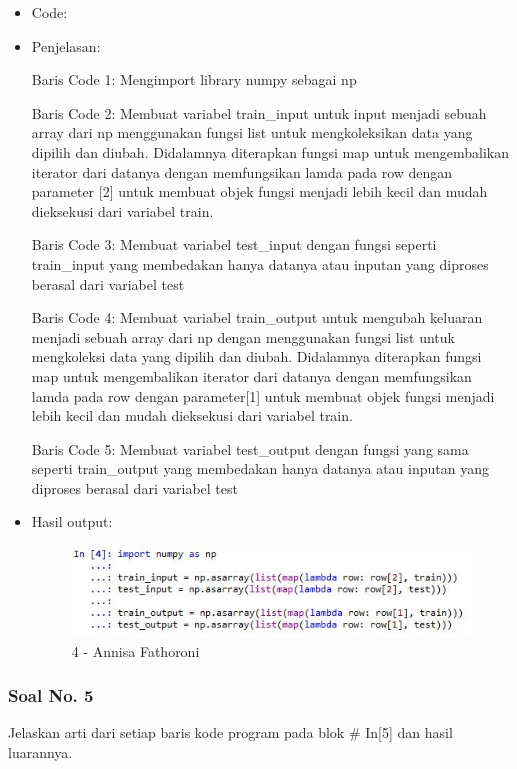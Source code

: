 \begin{itemize}
\item Code:


\item Penjelasan:

Baris Code 1: Mengimport library numpy sebagai np

Baris Code 2: Membuat variabel train\_input untuk input menjadi sebuah array dari np menggunakan fungsi list untuk mengkoleksikan data yang dipilih dan diubah. Didalamnya diterapkan fungsi map untuk mengembalikan iterator dari datanya dengan memfungsikan lamda pada row dengan parameter [2] untuk membuat objek fungsi menjadi lebih kecil dan mudah dieksekusi dari variabel train.

Baris Code 3: Membuat variabel test\_input dengan fungsi seperti train\_input yang membedakan hanya datanya atau inputan yang diproses berasal dari variabel test

Baris Code 4: Membuat variabel train\_output untuk mengubah keluaran menjadi sebuah array dari np dengan menggunakan fungsi list untuk mengkoleksi data yang dipilih dan diubah. Didalamnya diterapkan fungsi map untuk mengembalikan iterator dari datanya dengan memfungsikan lamda pada row dengan parameter[1] untuk membuat objek fungsi menjadi lebih kecil dan mudah dieksekusi dari variabel train.

Baris Code 5: Membuat variabel test\_output dengan fungsi yang sama seperti train\_output yang membedakan hanya datanya atau inputan yang diproses berasal dari variabel test

\item Hasil output:

\begin{figure}[!hbtp]
\centering
\includegraphics[scale=0.7]{figures/Chapter 7/1164067/Praktek/Chapter7AnnisaFathoroni4.jpg}
\caption{4 - Annisa Fathoroni}
\label{4 - Annisa Fathoroni}
\end{figure}

\end{itemize}

\subsubsection{Soal No. 5}
Jelaskan arti dari setiap baris kode program pada blok \# In[5] dan hasil luarannya.

